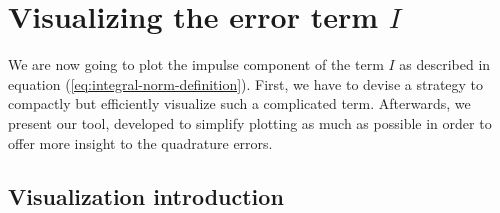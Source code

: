 \documentclass{article}
\begin{document}
\newcommand{\fracsumme}{\mathtt{approx\_int}}




\section{\texorpdfstring{Visualizing the error term $I$}{Visualizing the error term I}}
\label{sec:making-the-whole-thing-interactive}

We are now going to plot the impulse component of the term $I$ as described in equation (\ref{eq:integral-norm-definition}).
First, we have to devise a strategy to compactly but efficiently visualize such a complicated term.
Afterwards, we present our tool, developed to simplify plotting as much as possible in order to offer more insight to the quadrature errors.

\subsection{Visualization introduction}
\label{sec:a-word-on-visualization}
\end{document}
